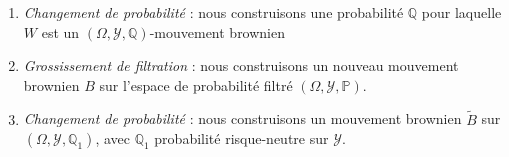 \documentclass[../finalreport.tex]{subfiles}
\begin{document}
\begin{enumerate}
\item \textit{Changement de probabilité} : nous construisons une probabilité $\mathbb{Q}$ pour laquelle $W$ est un $\left(\Omega, \mathcal{Y}, \mathbb{Q} \right)$-mouvement brownien
\item \textit{Grossissement de filtration} : nous construisons un nouveau mouvement brownien $B$ sur l'espace de probabilité filtré  $(\Omega, \mathcal{Y}, \mathbb{P})$.
\item \textit{Changement de probabilité} : nous construisons un mouvement brownien $\tilde{B}$ sur $\left(\Omega, \mathcal{Y}, \mathbb{Q}_1 \right)$, avec $\mathbb{Q}_1$ probabilité risque-neutre sur $\mathcal{Y}$.
\end{enumerate}
\end{document}
